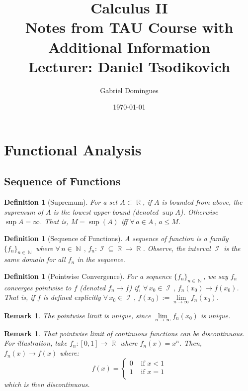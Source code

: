 \documentclass[12pt]{article}
\title{%
  Calculus II \\
  \large Notes from TAU Course with Additional Information\\
  Lecturer: Daniel Tsodikovich 
}
\author{Gabriel Domingues}
\date{\today}
\newcommand{\Forall}[1]{\forall\,{#1}\,,\,}
\DeclareMathOperator{\R}{\mathbb{R}}
\DeclareMathOperator{\N}{\mathbb{N}}
\DeclareMathOperator{\I}{\mathcal{I}}
\newcommand{\seq}[2]{\{{#1}\}_{#2\in\N}}
\newtheorem{definition}[theorem]{Definition}
\newtheorem{remark}[theorem]{Remark}
\begin{document}
\maketitle

\tableofcontents

\doclicenseThis

\pagebreak

\section{Functional Analysis}

\subsection{Sequence of Functions}

\begin{definition}[Supremum]
  \label{def_supremum}
  For a set $A\subset\R$, if $A$ is bounded from above, the supremum of $A$ is the lowest upper bound (denoted $\sup A$). Otherwise $\sup A=\infty$.
  \noindent That is, $M=\sup(A)$ iff $\Forall{a\in A}a\leq M$.
\end{definition}

\begin{definition}[Sequence of Functions]
  A sequence of function is a family $\seq{f_n}{n}$ where $\Forall{n\in\N}f_n:\I\subseteq\R\to\R$. Observe, the interval $\I$ is the same domain for all $f_n$ in the sequence.
\end{definition}

\begin{definition}[Pointwise Convergence]
  \label{def_pc_fn}
  For a sequence $\seq{f_n}{n}$, we say $f_n$ converges pointwise to $f$ (denoted $f_n\to f$) if, $\Forall{x_0\in\I}f_n(x_0)\to f(x_0)$. That is, if $f$ is defined explicitly $\Forall{x_0\in\I} f(x_0):=\lim\limits_{n\to\infty}f_n(x_0)$.
\end{definition}

\begin{remark}
  \label{pw_limit}
  The pointwise limit is unique, since $\lim\limits_{n\to\infty}f_n(x_0)$ is unique.
\end{remark}

\begin{remark}
  That pointwise limit of continuous functions can be discontinuous. For illustration, take $f_n:[0,1]\to\R$ where $f_n(x)=x^n$. Then, $f_n(x)\to f(x)$ where: $$f(x)=\begin{cases}
    0 &\text{ if }x<1\\
    1 &\text{ if }x=1\\
  \end{cases}$$
  which is then discontinuous.
\end{remark}
\end{document}
